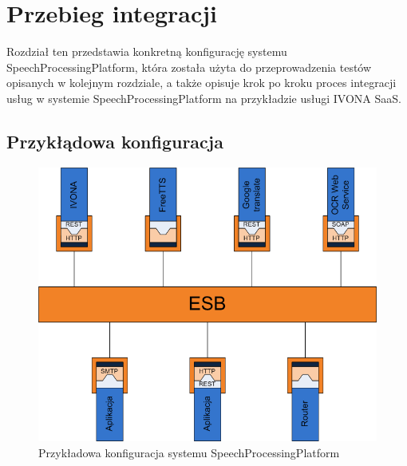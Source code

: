 

\chapter{Przebieg integracji} %



\ifpdf
    \graphicspath{{8/figures/PNG/}{8/figures/PDF/}{8/figures/}}
\else
    \graphicspath{{8/figures/EPS/}{8/figures/}}
\fi


Rozdział ten przedstawia konkretną konfigurację systemu SpeechProcessingPlatform, która została użyta do przeprowadzenia testów opisanych w kolejnym rozdziale, a także opisuje krok po kroku proces integracji usług w systemie SpeechProcessingPlatform na przykładzie usługi IVONA SaaS.
\section{Przykłądowa konfiguracja}

\begin{figure}[!h]
	\centering
	\includegraphics[scale=0.6]{esb.png}
	\caption{Przykładowa konfiguracja  systemu SpeechProcessingPlatform}\label{fig:esb_configuration}
\end{figure}

